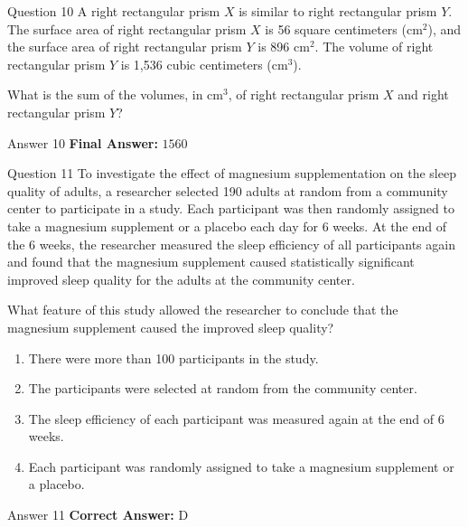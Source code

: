 \documentclass{beamer}
\begin{document}
\begin{frame}{Question 10}
\small
A right rectangular prism \(X\) is similar to right rectangular prism \(Y\). The surface area of right rectangular prism \(X\) is 56 square centimeters (\(\text{cm}^2\)), and the surface area of right rectangular prism \(Y\) is 896 \(\text{cm}^2\). The volume of right rectangular prism \(Y\) is 1,536 cubic centimeters (\(\text{cm}^3\)).

What is the sum of the volumes, in \(\text{cm}^3\), of right rectangular prism \(X\) and right rectangular prism \(Y\)?
\end{frame}
\begin{frame}{Answer 10}
\small
\textbf{Final Answer:} $\boxed{1560}$
\end{frame}

\begin{frame}{Question 11}
\small
To investigate the effect of magnesium supplementation on the sleep quality of adults, a researcher selected 190 adults at random from a community center to participate in a study. Each participant was then randomly assigned to take a magnesium supplement or a placebo each day for 6 weeks. At the end of the 6 weeks, the researcher measured the sleep efficiency of all participants again and found that the magnesium supplement caused statistically significant improved sleep quality for the adults at the community center.

What feature of this study allowed the researcher to conclude that the magnesium supplement caused the improved sleep quality?
\vspace{0.35cm}
\begin{enumerate}
    \item[A.] There were more than 100 participants in the study.
    \item[B.] The participants were selected at random from the community center.
    \item[C.] The sleep efficiency of each participant was measured again at the end of 6 weeks.
    \item[D.] Each participant was randomly assigned to take a magnesium supplement or a placebo.
\end{enumerate}
\end{frame}
\begin{frame}{Answer 11}
\small
\textbf{Correct Answer:} D
\end{frame}
\end{document}
